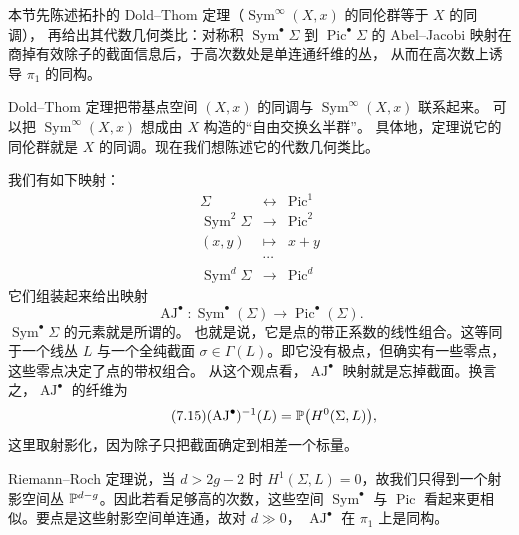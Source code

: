 \begin{sectionkey}
本节先陈述拓扑的 Dold--Thom 定理（$\operatorname{Sym}^\infty(X,x)$ 的同伦群等于 $X$ 的同调），
再给出其代数几何类比：对称积 $\operatorname{Sym}^\bullet\Sigma$ 到 $\operatorname{Pic}^\bullet\Sigma$
的 Abel--Jacobi 映射在商掉有效除子的截面信息后，于高次数处是单连通纤维的丛，
从而在高次数上诱导 $\pi_1$ 的同构。
\end{sectionkey}

Dold--Thom 定理把带基点空间 $(X,x)$ 的同调与 $\operatorname{Sym}^{\infty}(X,x)$ 联系起来。
可以把 $\operatorname{Sym}^{\infty}(X,x)$ 想成由 $X$ 构造的“自由交换幺半群”。
具体地，定理说它的同伦群就是 $X$ 的同调。现在我们想陈述它的代数几何类比。

我们有如下映射：
\begin{equation}\tag{7.13}\label{eq:7.13}
\begin{array}{rcl}
\Sigma & \longleftrightarrow & \operatorname{Pic}^1\\[2pt]
\operatorname{Sym}^2\Sigma & \longrightarrow & \operatorname{Pic}^2\\[2pt]
(x,y) & \longmapsto & x+y\\[2pt]
& \cdots &\\[2pt]
\operatorname{Sym}^d\Sigma & \longrightarrow & \operatorname{Pic}^d
\end{array}
\end{equation}
它们组装起来给出映射
\begin{equation}\tag{7.14}\label{eq:7.14}
\operatorname{AJ}^{\bullet}\colon\operatorname{Sym}^{\bullet}(\Sigma)\to\operatorname{Pic}^{\bullet}(\Sigma).
\end{equation}
$\operatorname{Sym}^{\bullet}\Sigma$ 的元素就是所谓的。
也就是说，它是点的带正系数的线性组合。这等同于一个线丛 $L$ 与一个全纯截面
$\sigma\in\Gamma(L)$。即它没有极点，但确实有一些零点，这些零点决定了点的带权组合。
从这个观点看，$\operatorname{AJ}^{\bullet}$ 映射就是忘掉截面。换言之，$\operatorname{AJ}^{\bullet}$
的纤维为
\begin{equation}\tag{7.15}\label{eq:7.15}
(\operatorname{AJ}^{\bullet})^{-1}(L)=\mathbb{P}\bigl(H^0(\Sigma,L)\bigr),
\end{equation}
这里取射影化，因为除子只把截面确定到相差一个标量。

Riemann--Roch 定理说，当 $d>2g-2$ 时 $H^1(\Sigma,L)=0$，故我们只得到一个射影空间丛
$\mathbb{P}^{d-g}$。因此若看足够高的次数，这些空间 $\operatorname{Sym}^{\bullet}$ 与
$\operatorname{Pic}$ 看起来更相似。要点是这些射影空间单连通，故对 $d\gg 0$，
$\operatorname{AJ}^{\bullet}$ 在 $\pi_1$ 上是同构。

